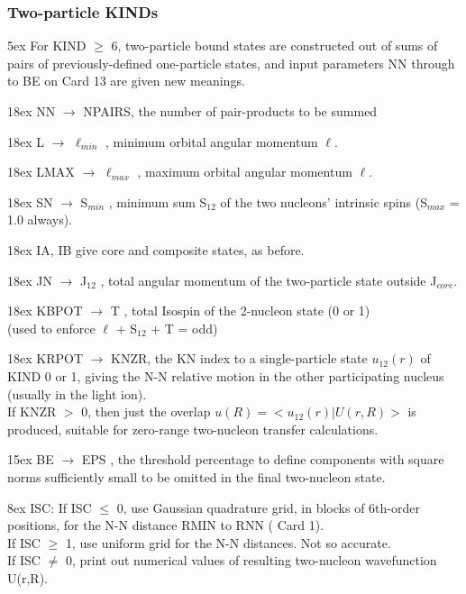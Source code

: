 \documentclass[11pt]{article}
\begin{document}
\subsubsection{Two-particle KINDs}
\bigskip

\hangindent 5ex
For KIND $\geq$ 6,   two-particle bound states are constructed out of sums
of pairs of previously-defined one-particle states,
and input parameters NN through to BE on Card 13 are given new meanings.
\bigskip

\hangindent 18ex
NN    $\rightarrow$ NPAIRS, the number of pair-products to be summed

\hangindent 18ex
L     $\rightarrow$ $\ell_{min}$ , minimum orbital angular momentum $\ell$.

\hangindent 18ex
LMAX  $\rightarrow$ $\ell_{max}$  , maximum orbital angular momentum $\ell$.

\hangindent 18ex
SN    $\rightarrow$ S$_{min}$  , minimum sum S$_{12}$ of the two nucleons' intrinsic spins
                 (S$_{max}$ = 1.0 always).

\hangindent 18ex
IA, IB   give core and composite states, as before.

\hangindent 18ex
JN    $\rightarrow$ J$_{12}$   , total angular momentum of the two-particle state
outside J$_{core}$.

\hangindent 18ex
KBPOT $\rightarrow$ T     , total Isospin  of the 2-nucleon state (0 or 1)
\\
(used to enforce  $\ell$ + S$_{12}$ + T = odd)

\hangindent 18ex
KRPOT $\rightarrow$ KNZR, the KN index to a single-particle state $u_{12}(r)$
of KIND 0 or 1, giving the N-N relative motion in the
other participating nucleus (usually in the light ion).
\\
If KNZR $>$ 0, then just the overlap $ u(R)  =  <u_{12}(r) | U(r,R) > $ is
produced, suitable for zero-range two-nucleon transfer calculations.

\hangindent 15ex
BE    $\rightarrow$ EPS   , the threshold percentage to define components with
square norms sufficiently small to be omitted in the final two-nucleon
state.

\hangindent 8ex  ISC:
      If ISC $\le$ 0, use Gaussian quadrature grid, in blocks of 6th-order
      positions, for the N-N distance RMIN to RNN ( Card 1).
\\  If ISC $\geq$ 1, use uniform grid for the N-N distances.  Not so accurate.
\\  If ISC $\neq$ 0, print out numerical values of resulting two-nucleon wavefunction
U(r,R).
\end{document}
